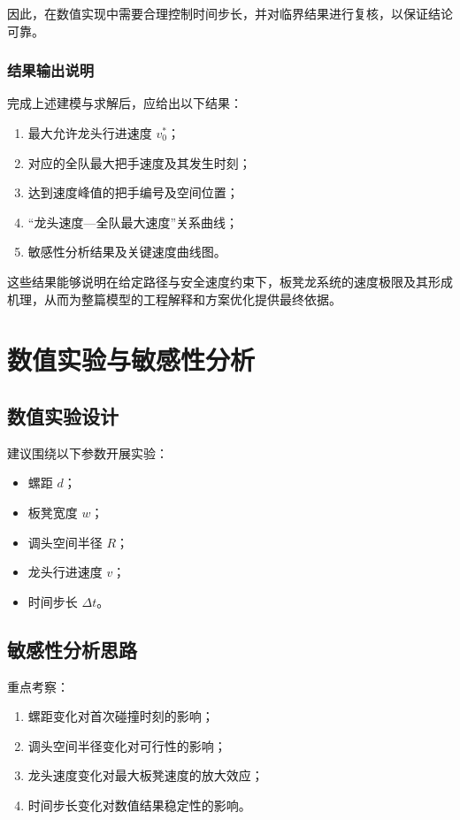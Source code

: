 \documentclass[12pt,a4paper]{ctexart}
\begin{document}
因此，在数值实现中需要合理控制时间步长，并对临界结果进行复核，以保证结论可靠。

\subsubsection{结果输出说明}
完成上述建模与求解后，应给出以下结果：

\begin{enumerate}
    \item 最大允许龙头行进速度 $v_0^\ast$；
    \item 对应的全队最大把手速度及其发生时刻；
    \item 达到速度峰值的把手编号及空间位置；
    \item “龙头速度—全队最大速度”关系曲线；
    \item 敏感性分析结果及关键速度曲线图。
\end{enumerate}

\noindent 这些结果能够说明在给定路径与安全速度约束下，板凳龙系统的速度极限及其形成机理，从而为整篇模型的工程解释和方案优化提供最终依据。

\section{数值实验与敏感性分析}

\subsection{数值实验设计}
建议围绕以下参数开展实验：
\begin{itemize}[leftmargin=2em]
    \item 螺距 $d$；
    \item 板凳宽度 $w$；
    \item 调头空间半径 $R$；
    \item 龙头行进速度 $v$；
    \item 时间步长 $\Delta t$。
\end{itemize}

\subsection{敏感性分析思路}
重点考察：
\begin{enumerate}[leftmargin=2em]
    \item 螺距变化对首次碰撞时刻的影响；
    \item 调头空间半径变化对可行性的影响；
    \item 龙头速度变化对最大板凳速度的放大效应；
    \item 时间步长变化对数值结果稳定性的影响。
\end{enumerate}
\end{document}
